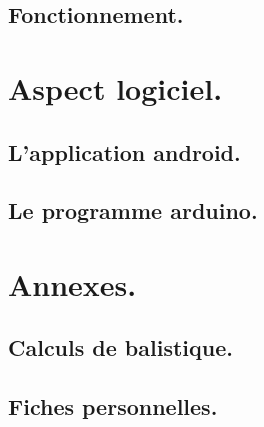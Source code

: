 \documentclass{report}
\begin{document}
\chapter{Fonctionnement.} \label{fonc}
% 

\part{Aspect logiciel.}
\chapter{L'application android.} \label{andro}
% 

\chapter{Le programme arduino.} \label{ardui}
% 

\part{Annexes.}
\appendix

\chapter{Calculs de balistique.} \label{balis}
% 

\chapter{Fiches personnelles.}

\newpage
\listoffigures
{}
\end{document}
